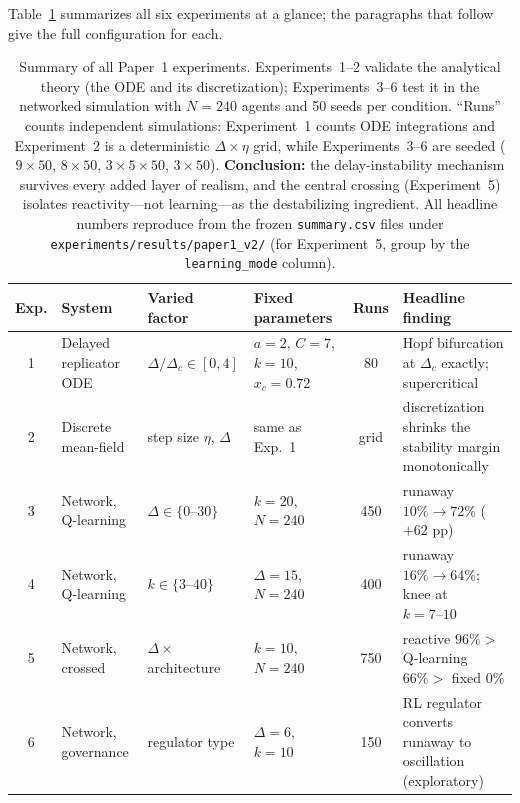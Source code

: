 Table~\ref{tab:experiment_summary} summarizes all six experiments at a glance; the paragraphs that follow give the full configuration for each.

\begin{table}[ht]
\centering
\footnotesize
\setlength{\tabcolsep}{4pt}
\begin{tabular}{@{}clp{2.2cm}p{2.3cm}cp{3.2cm}@{}}
\toprule
Exp. & System & Varied factor & Fixed parameters & Runs & Headline finding \\
\midrule
1 & Delayed replicator ODE & $\Delta/\Delta_c \in [0,4]$ & $a{=}2$, $C{=}7$, $k{=}10$, $x_c{=}0.72$ & 80 & Hopf bifurcation at $\Delta_c$ exactly; supercritical \\
2 & Discrete mean-field & step size $\eta$, $\Delta$ & same as Exp.~1 & grid & discretization shrinks the stability margin monotonically \\
3 & Network, Q-learning & $\Delta \in \{0\text{--}30\}$ & $k{=}20$, $N{=}240$ & 450 & runaway $10\% \to 72\%$ ($+62$ pp) \\
4 & Network, Q-learning & $k \in \{3\text{--}40\}$ & $\Delta{=}15$, $N{=}240$ & 400 & runaway $16\% \to 64\%$; knee at $k{=}7\text{--}10$ \\
5 & Network, crossed & $\Delta \times$ architecture & $k{=}10$, $N{=}240$ & 750 & reactive $96\% >$ Q-learning $66\% >$ fixed $0\%$ \\
6 & Network, governance & regulator type & $\Delta{=}6$, $k{=}10$ & 150 & RL regulator converts runaway to oscillation (exploratory) \\
\bottomrule
\end{tabular}
\caption{Summary of all Paper~1 experiments. Experiments~1--2 validate the analytical theory (the ODE and its discretization); Experiments~3--6 test it in the networked simulation with $N{=}240$ agents and 50 seeds per condition. ``Runs'' counts independent simulations: Experiment~1 counts ODE integrations and Experiment~2 is a deterministic $\Delta\times\eta$ grid, while Experiments~3--6 are seeded ($9{\times}50$, $8{\times}50$, $3{\times}5{\times}50$, $3{\times}50$). \textbf{Conclusion:} the delay-instability mechanism survives every added layer of realism, and the central crossing (Experiment~5) isolates reactivity---not learning---as the destabilizing ingredient. All headline numbers reproduce from the frozen \texttt{summary.csv} files under \texttt{experiments/results/paper1\_v2/} (for Experiment~5, group by the \texttt{learning\_mode} column).}
\label{tab:experiment_summary}
\end{table}

